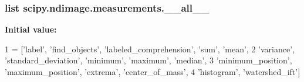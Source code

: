 \subsubsection[{\+\_\+\+\_\+all\+\_\+\+\_\+}]{\setlength{\rightskip}{0pt plus 5cm}list scipy.\+ndimage.\+measurements.\+\_\+\+\_\+all\+\_\+\+\_\+}\label{namespacescipy_1_1ndimage_1_1measurements_a17b33fc777402ef9fdbe9d54340d2721}
{\bfseries Initial value\+:}
\begin{DoxyCode}
1 = [\textcolor{stringliteral}{'label'}, \textcolor{stringliteral}{'find\_objects'}, \textcolor{stringliteral}{'labeled\_comprehension'}, \textcolor{stringliteral}{'sum'}, \textcolor{stringliteral}{'mean'},
2            \textcolor{stringliteral}{'variance'}, \textcolor{stringliteral}{'standard\_deviation'}, \textcolor{stringliteral}{'minimum'}, \textcolor{stringliteral}{'maximum'}, \textcolor{stringliteral}{'median'},
3            \textcolor{stringliteral}{'minimum\_position'}, \textcolor{stringliteral}{'maximum\_position'}, \textcolor{stringliteral}{'extrema'}, \textcolor{stringliteral}{'center\_of\_mass'},
4            \textcolor{stringliteral}{'histogram'}, \textcolor{stringliteral}{'watershed\_ift'}]
\end{DoxyCode}
